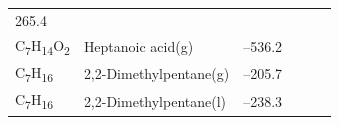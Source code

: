 \documentclass[
]{book}
\theoremstyle{definition}
\theoremstyle{definition}
\theoremstyle{definition}
\theoremstyle{remark}
\begin{document}
\begin{longtable}[]{@{}llllll@{}}
\begin{minipage}[t]{0.14\columnwidth}
265.4\strut
\end{minipage}\tabularnewline
\begin{minipage}[t]{0.07\columnwidth}\raggedright
C\textsubscript{7}H\textsubscript{14}O\textsubscript{2}\strut
\end{minipage} & \begin{minipage}[t]{0.17\columnwidth}\raggedright
Heptanoic acid(g)\strut
\end{minipage} & \begin{minipage}[t]{0.15\columnwidth}\raggedright
--536.2\strut
\end{minipage} & \begin{minipage}[t]{0.15\columnwidth}\raggedright
\strut
\end{minipage} & \begin{minipage}[t]{0.14\columnwidth}\raggedright
\strut
\end{minipage} & \begin{minipage}[t]{0.14\columnwidth}\raggedright
\strut
\end{minipage}\tabularnewline
\begin{minipage}[t]{0.07\columnwidth}\raggedright
C\textsubscript{7}H\textsubscript{16}\strut
\end{minipage} & \begin{minipage}[t]{0.17\columnwidth}\raggedright
2,2-Dimethylpentane(g)\strut
\end{minipage} & \begin{minipage}[t]{0.15\columnwidth}\raggedright
--205.7\strut
\end{minipage} & \begin{minipage}[t]{0.15\columnwidth}\raggedright
\strut
\end{minipage} & \begin{minipage}[t]{0.14\columnwidth}\raggedright
\strut
\end{minipage} & \begin{minipage}[t]{0.14\columnwidth}\raggedright
\strut
\end{minipage}\tabularnewline
\begin{minipage}[t]{0.07\columnwidth}\raggedright
C\textsubscript{7}H\textsubscript{16}\strut
\end{minipage} & \begin{minipage}[t]{0.17\columnwidth}\raggedright
2,2-Dimethylpentane(l)\strut
\end{minipage} & \begin{minipage}[t]{0.15\columnwidth}\raggedright
--238.3\strut
\end{minipage} & \begin{minipage}[t]{0.15\columnwidth}\raggedright

\end{minipage}
\end{longtable}
\end{document}
